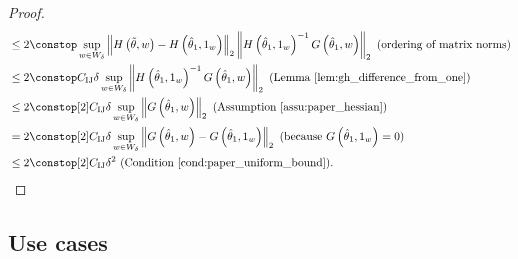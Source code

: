 \begin{proof}
\begin{align*}
 & \le2\constop\sup_{w\in W_{\delta}}\norm{H\left(\thetawiggle,w\right)-H\left(\thetaone,\onevec\right)}_{2}\norm{H\left(\thetaone,\onevec\right)^{-1}G\left(\thetaone,w\right)}_{2}\textrm{ (ordering of matrix norms)}\\
 & \le2\constop\constij\delta\sup_{w\in W_{\delta}}\norm{H\left(\thetaone,\onevec\right)^{-1}G\left(\thetaone,w\right)}_{2}\textrm{ (Lemma \ref{lem:gh_difference_from_one})}\\
 & \le2\constop[2]\constij\delta\sup_{w\in W_{\delta}}\norm{G\left(\thetaone,w\right)}_{2}\textrm{ (Assumption \ref{assu:paper_hessian})}\\
 & =2\constop[2]\constij\delta\sup_{w\in W_{\delta}}\norm{G\left(\thetaone,w\right)-G\left(\thetaone,\onevec\right)}_{2}\textrm{ (because }G\left(\thetaone,\onevec\right)=0\textrm{)}\\
 & \le2\constop[2]\constij\delta^{2}\textrm{ (Condition \ref{cond:paper_uniform_bound})}.
\end{align*}
\end{proof}
%




\subsection{Use cases\label{sec:use_cases}}

